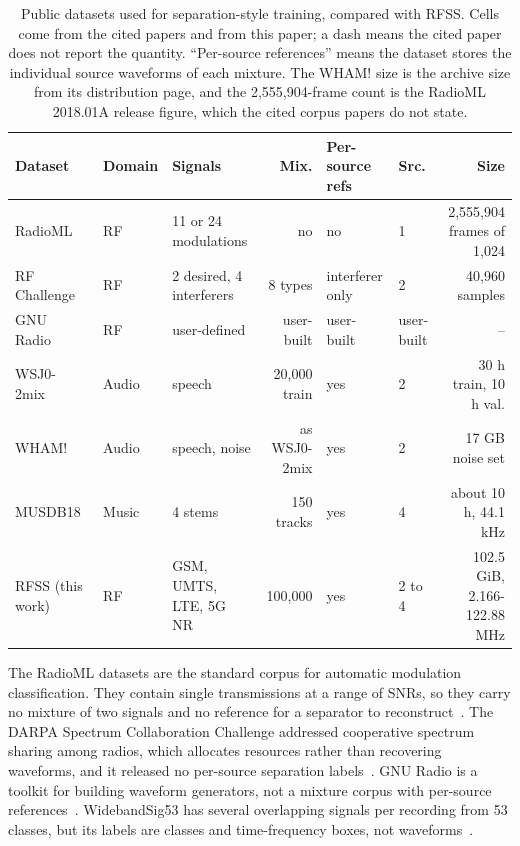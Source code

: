 \documentclass[journal]{IEEEtran}
\begin{document}
\begin{table}[t]
\centering
\caption{Public datasets used for separation-style training, compared with
RFSS. Cells come from the cited papers and from this paper; a dash means the
cited paper does not report the quantity. ``Per-source references'' means the
dataset stores the individual source waveforms of each mixture. The WHAM! size
is the archive size from its distribution page, and the 2,555,904-frame count is
the RadioML 2018.01A release figure, which the cited corpus papers do not state.}
\label{tab:related}
\begin{tabular}{lllrllr}
\toprule
Dataset & Domain & Signals & Mix. & Per-source refs & Src. & Size \\
\midrule
RadioML~\cite{oshea2016radio,oshea2016convolutional,oshea2018over} & RF & 11 or 24 modulations & no & no & 1 & 2,555,904 frames of 1,024 \\
RF Challenge~\cite{lancho2024rfchallenge} & RF & 2 desired, 4 interferers & 8 types & interferer only & 2 & 40,960 samples \\
GNU Radio~\cite{blossom2004gnu} & RF & user-defined & user-built & user-built & user-built & -- \\
WSJ0-2mix~\cite{hershey2016deep,luo2019conv} & Audio & speech & 20,000 train & yes & 2 & 30 h train, 10 h val. \\
WHAM!~\cite{wichern2019wham} & Audio & speech, noise & as WSJ0-2mix & yes & 2 & 17 GB noise set \\
MUSDB18~\cite{rafii2017musdb18} & Music & 4 stems & 150 tracks & yes & 4 & about 10 h, 44.1 kHz \\
\midrule
RFSS (this work) & RF & GSM, UMTS, LTE, 5G NR & 100,000 & yes & 2 to 4 & 102.5 GiB, 2.166-122.88 MHz \\
\bottomrule
\end{tabular}
\end{table}

The RadioML datasets are the standard corpus for automatic modulation
classification. They contain single transmissions at a range of SNRs, so they
carry no mixture of two signals and no reference for a separator to
reconstruct~\cite{oshea2016radio,oshea2016convolutional,oshea2018over}. The
DARPA Spectrum Collaboration Challenge addressed cooperative spectrum sharing
among radios, which allocates resources rather than recovering waveforms, and
it released no per-source separation labels~\cite{mennes2020sc2}. GNU Radio
is a toolkit for building waveform generators, not a mixture corpus with
per-source references~\cite{blossom2004gnu}. WidebandSig53 has several
overlapping signals per recording from 53 classes, but its labels are classes
and time-frequency boxes, not waveforms~\cite{boegner2022wideband}.
\end{document}
